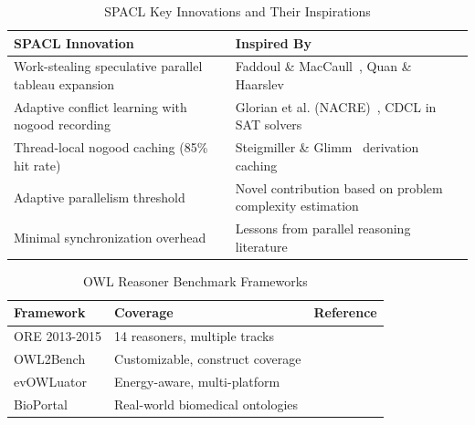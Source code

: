 \begin{table}[t]
\centering
\caption{SPACL Key Innovations and Their Inspirations}
\label{tab:spacl_innovations}
\begin{tabular}{p{4cm}|p{3.5cm}}
\hline
\textbf{SPACL Innovation} & \textbf{Inspired By} \\
\hline
\hline
Work-stealing speculative parallel tableau expansion & 
Faddoul \& MacCaull~\cite{faddoul2015fork}, Quan \& Haarslev~\cite{quan2017parallel} \\
\hline
Adaptive conflict learning with nogood recording & 
Glorian et al. (NACRE)~\cite{glorian2020nacre}, CDCL in SAT solvers \\
\hline
Thread-local nogood caching (85\% hit rate) & 
Steigmiller \& Glimm~\cite{steigmiller2020parallelised} derivation caching \\
\hline
Adaptive parallelism threshold & 
Novel contribution based on problem complexity estimation \\
\hline
Minimal synchronization overhead & 
Lessons from parallel reasoning literature~\cite{quan2019framework} \\
\hline
\end{tabular}
\end{table}

\begin{table}[t]
\centering
\caption{OWL Reasoner Benchmark Frameworks}
\label{tab:benchmark_frameworks}
\begin{tabular}{l|l|l}
\hline
\textbf{Framework} & \textbf{Coverage} & \textbf{Reference} \\
\hline
\hline
ORE 2013-2015 & 14 reasoners, multiple tracks & \cite{parsia2015ore} \\
OWL2Bench & Customizable, construct coverage & \cite{singh2020owl2bench} \\
evOWLuator & Energy-aware, multi-platform & \cite{bilenchi2021multiplatform} \\
BioPortal & Real-world biomedical ontologies & \cite{noy2009bioportal} \\
\hline
\end{tabular}
\end{table}


